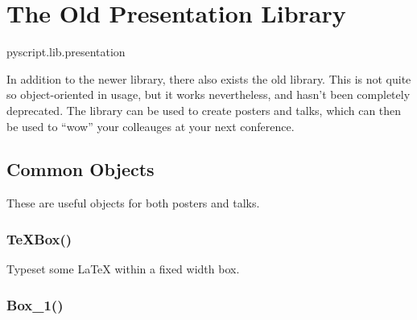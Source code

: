 % 
%
%


\chapter{The Old Presentation Library}

\begin{python}
pyscript.lib.presentation
\end{python}

In addition to the newer  library, there also
exists the old  library.  This is not quite
so object-oriented in usage, but it works nevertheless, and hasn't been
completely deprecated.  The  library can be used to create
posters and talks, which can then be used to ``wow'' your colleauges at your
next conference.

\section{Common Objects}

These are useful objects for both posters and talks.

\subsection{TeXBox()}

Typeset some \LaTeX{} within a fixed width box.

\subsection{Box\_1()}

